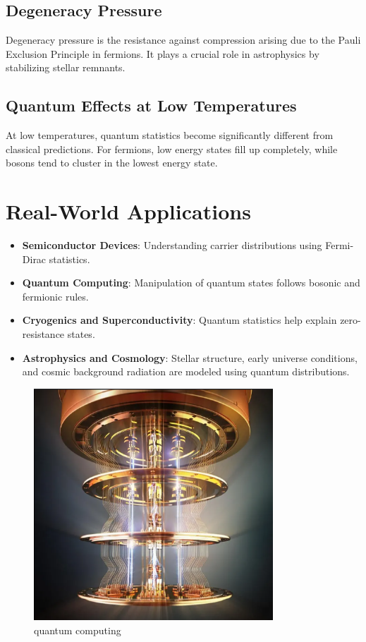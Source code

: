 \documentclass[12pt,a4paper]{article}
\begin{document}
\subsection{Degeneracy Pressure}
Degeneracy pressure is the resistance against compression arising due to the Pauli Exclusion Principle in fermions. It plays a crucial role in astrophysics by stabilizing stellar remnants.

\subsection{Quantum Effects at Low Temperatures}
At low temperatures, quantum statistics become significantly different from classical predictions. For fermions, low energy states fill up completely, while bosons tend to cluster in the lowest energy state.

\section{Real-World Applications}
\begin{itemize}
    \item \textbf{Semiconductor Devices}: Understanding carrier distributions using Fermi-Dirac statistics.
    \item \textbf{Quantum Computing}: Manipulation of quantum states follows bosonic and fermionic rules.
    \item \textbf{Cryogenics and Superconductivity}: Quantum statistics help explain zero-resistance states.
    \item \textbf{Astrophysics and Cosmology}: Stellar structure, early universe conditions, and cosmic background radiation are modeled using quantum distributions.
\end{itemize}

\begin{figure}[H]
    \centering
    \includegraphics[width=0.8\textwidth]{ss.png}
    \caption{quantum computing}
\end{figure}
\end{document}
